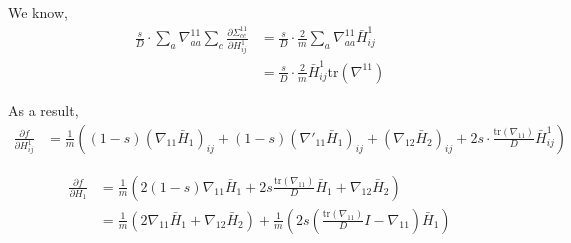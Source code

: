 \documentclass[12pt]{article}
\begin{document}
We know,
\begin{align*}
\frac{s}{D}\cdot \sum_{a}\nabla^{11}_{aa} \sum_{c}\frac{\partial\Sigma^{11}_{cc}}{\partial H^1_{ij}}
&= \frac{s}{D}\cdot \frac{2}{m} \sum_{a}\nabla^{11}_{aa} \bar H^1_{ij}\\
&= \frac{s}{D}\cdot \frac{2}{m} \bar H^1_{ij} \text{tr}(\nabla^{11})
\end{align*}

As a result,
\begin{align*}
  \frac{\partial f}{\partial H^1_{ij}}
&= \frac{1}{m}((1-s) (\nabla_{11}\bar H_1)_{ij} + (1-s) (\nabla'_{11}\bar H_1)_{ij} + (\nabla_{12}\bar H_2)_{ij} + 2s\cdot \frac{\text{tr}(\nabla_{11})}{D}\bar H^1_{ij})
\end{align*}

\begin{align*}
  \frac{\partial f}{\partial H_1}
&= \frac{1}{m} (2(1-s) \nabla_{11}\bar H_1 + 2s\frac{\text{tr}(\nabla_{11})}{D} \bar H_1 + \nabla_{12}\bar H_2)\\
&= \frac{1}{m} (2 \nabla_{11}\bar H_1 + \nabla_{12}\bar H_2)
  + \frac{1}{m} (2s(\frac{\text{tr}(\nabla_{11})}{D}I - \nabla_{11}) \bar H_1)
\end{align*}
\end{document}
